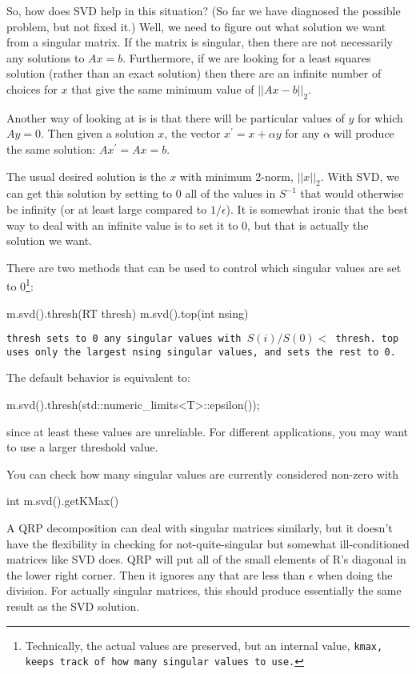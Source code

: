 So, how does SVD help in this situation?  (So far we have diagnosed
the possible problem, but not fixed it.)
Well, we need to figure out what solution we want from a singular matrix.
If the matrix is singular, then there are not necessarily any solutions
to $A x = b$.  Furthermore, if we are looking for a least squares solution 
(rather than an exact solution) then there are an infinite number of choices for 
$x$ that give the same minimum value of $||A x-b||_2$.

Another way of looking at is is that there will be particular values of $y$ 
for which $A y = 0$.
Then given a solution $x$, the vector $x^\prime = x + \alpha y$ for any $\alpha$
will produce 
the same solution: $A x^\prime = A x = b$.

The usual desired solution is the $x$ with minimum 2-norm, $||x||_2$.
With SVD, we can get this solution by setting to 0 all of the values
in $S^{-1}$ that would otherwise be infinity (or at least large compared
to $1/\epsilon$).  It is somewhat ironic that the best way to deal with 
an infinite value is to set it to 0, but that is actually the solution we want.

There are two methods that can be used to control which 
singular values are set to 0\footnote{Technically, the actual values are preserved,
but an internal value, \tt{kmax}, keeps track of how many singular values to use.}:
\begin{tmvcode}
m.svd().thresh(RT thresh)
m.svd().top(int nsing)
\end{tmvcode}
\tt{thresh} sets to 0 any singular values with $S(i)/S(0) <$ \tt{thresh}.
\tt{top} uses only the largest \tt{nsing} singular values, and sets the rest to 0.

The default behavior is equivalent to:
\begin{tmvcode}
m.svd().thresh(std::numeric_limits<T>::epsilon());
\end{tmvcode}
since at least these values are unreliable.  For different applications,
you may want to use a larger threshold value.

You can check how many singular values are currently considered non-zero with
\begin{tmvcode}
int m.svd().getKMax()
\end{tmvcode}

A QRP decomposition can deal with singular matrices similarly,
but it doesn't have the flexibility in checking for not-quite-singular
but somewhat ill-conditioned matrices like SVD does.
QRP will put all of the small elements of R's diagonal in the 
lower right corner.  Then it ignores any that are less than 
$\epsilon$ when doing the division.  For actually singular matrices,
this should produce essentially the same result as the SVD solution.

